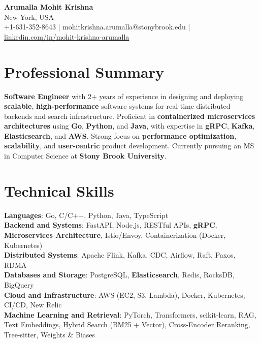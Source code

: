 \documentclass[letterpaper,11pt]{article}
\begin{document}
\begin{center}
  {\Large \textbf{Arumalla Mohit Krishna}} \\
  New York, USA \\
  +1-631-352-8643 \enspace | \enspace mohitkrishna.arumalla@stonybrook.edu \enspace | \enspace \href{https://www.linkedin.com/in/mohit-krishna-arumalla}{linkedin.com/in/mohit-krishna-arumalla}
\end{center}

\section{Professional Summary}
  \begin{itemize}[leftmargin=0.15in, label={}]
    \small{\item{
     \textbf{Software Engineer} with 2+ years of experience in designing and deploying \textbf{scalable}, \textbf{high-performance} software systems for real-time distributed backends and search infrastructure. Proficient in \textbf{containerized microservices architectures} using \textbf{Go}, \textbf{Python}, and \textbf{Java}, with expertise in \textbf{gRPC}, \textbf{Kafka}, \textbf{Elasticsearch}, and \textbf{AWS}. Strong focus on \textbf{performance optimization}, \textbf{scalability}, and \textbf{user-centric} product development. Currently pursuing an MS in Computer Science at \textbf{Stony Brook University}.
    }}
  \end{itemize}
\vspace{-16pt}

\section{Technical Skills}
 \begin{itemize}[leftmargin=0.15in, label={}]
    \small{\item{
     \textbf{Languages}: Go, C/C++, Python, Java, TypeScript \\
     \textbf{Backend and Systems}: FastAPI, Node.js, RESTful APIs, \textbf{gRPC}, \textbf{Microservices Architecture}, Istio/Envoy, Containerization (Docker, Kubernetes) \\
     \textbf{Distributed Systems}: Apache Flink, Kafka, CDC, Airflow, Raft, Paxos, RDMA \\
     \textbf{Databases and Storage}: PostgreSQL, \textbf{Elasticsearch}, Redis, RocksDB, BigQuery \\
     \textbf{Cloud and Infrastructure}: AWS (EC2, S3, Lambda), Docker, Kubernetes, CI/CD, New Relic \\
     \textbf{Machine Learning and Retrieval}: PyTorch, Transformers, scikit-learn, RAG, Text Embeddings, Hybrid Search (BM25 + Vector), Cross-Encoder Reranking, Tree-sitter, Weights \& Biases
    }}
 \end{itemize}
\vspace{-16pt}
\end{document}
